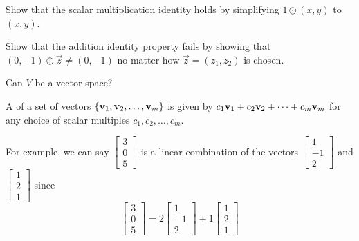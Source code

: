 \begin{applicationActivities}
\begin{activity}{15}
  \begin{subactivity}
    Show that the scalar multiplication identity holds by
    simplifying \(1\odot(x,y)\) to \((x,y)\).
  \end{subactivity}

  \begin{subactivity}
    Show that the addition identity property fails by
    showing that \((0,-1)\oplus\vec z\not=(0,-1)\) no matter how
    \(\vec z=(z_1,z_2)\) is chosen.
  \end{subactivity}

  \begin{subactivity}
    Can \(V\) be a vector space?
  \end{subactivity}
\end{activity}

\begin{definition}
  A  of a set of vectors
  \(\{\mathbf v_1,\mathbf v_2,\dots,\mathbf v_m\}\) is given by
  \(c_1\mathbf v_1+c_2\mathbf v_2+\dots+c_m\mathbf v_m\) for any choice of
  scalar multiples \(c_1,c_2,\dots,c_m\).

	\vspace{2em}

  For example, we can say \(\begin{bmatrix}3 \\0 \\ 5\end{bmatrix}\) is a linear combination of the vectors \(\begin{bmatrix} 1 \\ -1 \\ 2 \end{bmatrix}\) and \(\begin{bmatrix} 1 \\ 2 \\ 1 \end{bmatrix}\) since \[\begin{bmatrix} 3 \\ 0 \\ 5 \end{bmatrix} = 2 \begin{bmatrix} 1 \\ -1 \\ 2 \end{bmatrix} + 1\begin{bmatrix} 1 \\ 2 \\ 1 \end{bmatrix}\]
\end{definition}


\end{applicationActivities}
